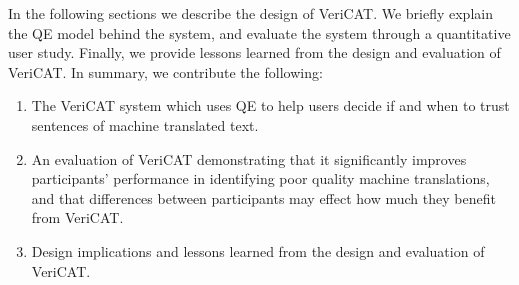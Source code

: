 


In the following sections we describe the design of VeriCAT. We briefly explain the QE model behind the system, and evaluate the system through a quantitative user study. Finally, we provide lessons learned from the design and evaluation of VeriCAT. %
In summary, we contribute the following: 

\begin{enumerate}
    \item The VeriCAT system which uses QE to help users decide if and when to trust sentences of machine translated text.   
    \item An evaluation of VeriCAT demonstrating that it significantly improves participants' performance in identifying poor quality machine translations, and that differences between participants may effect how much they benefit from VeriCAT.
    \item Design implications and lessons learned from the design and evaluation of VeriCAT. 
\end{enumerate}

